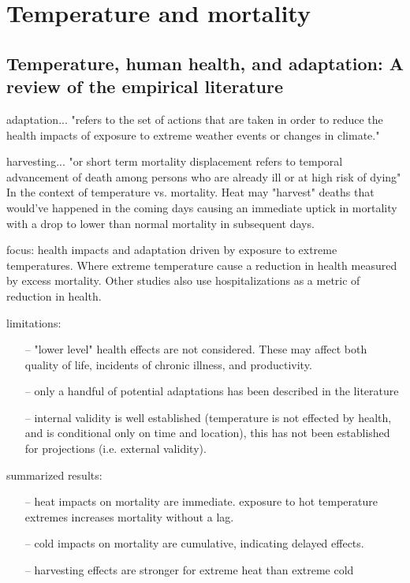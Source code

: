 \documentclass[11pt]{article}
\begin{document}
\section{Temperature and mortality}

\subsection*{\citep{Deschenes2014} Temperature, human health, and adaptation: A review of the empirical literature}

adaptation... "refers to the set of actions that are taken in order to reduce the health impacts of exposure to extreme weather events or changes in climate." 

harvesting... "or short term mortality displacement refers to temporal advancement of death among persons who are already ill or at high risk of dying" In the context of temperature vs. mortality. Heat may "harvest" deaths that would've happened in the coming days causing an immediate uptick in mortality with a drop to lower than normal mortality in subsequent days. 

focus: health impacts and adaptation driven by exposure to extreme temperatures. Where extreme temperature cause a reduction in health measured by excess mortality. Other studies also use hospitalizations as a metric of reduction in health.

limitations: 

\begin{itemize}
\item[--] "lower level" health effects are not considered. These may affect both quality of life, incidents of chronic illness, and productivity. 
\item[--] only a handful of potential adaptations has been described in the literature
\item[--] internal validity is well established (temperature is not effected by health, and is conditional only on time and location), this has not been established for projections (i.e. external validity).
\end{itemize}

summarized results: 

\begin{itemize}
\item[--] heat impacts on mortality are immediate. exposure to hot temperature extremes increases mortality without a lag. 
\item[--] cold impacts on mortality are cumulative, indicating delayed effects. 
\item[--] harvesting effects are stronger for extreme heat than extreme cold
\end{itemize}
\end{document}
